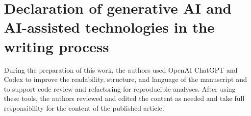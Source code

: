 \documentclass[preprint,12pt,authoryear]{elsarticle}
\begin{document}
\section*{Declaration of generative AI and AI-assisted technologies in the writing process}
During the preparation of this work, the authors used OpenAI ChatGPT and Codex to improve the readability, structure, and language of the manuscript and to support code review and refactoring for reproducible analyses. After using these tools, the authors reviewed and edited the content as needed and take full responsibility for the content of the published article.

\clearpage




\clearpage
\appendix

\end{document}
